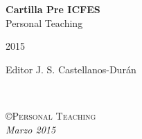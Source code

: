 \documentclass[12pt,fleqn]{book} %
\begin{document}

\newcommand{\institutionauthor}{Personal Teaching}
\begingroup
\thispagestyle{empty}
\centering
\vspace*{5.8cm}
\par\normalfont\fontsize{35}{35}\sffamily\selectfont
\textbf{Cartilla Pre ICFES}\\
\vspace*{0.5cm}
{\Huge Personal Teaching}\par %
{\Huge 2015}\par %
\vspace*{1.cm}
{\LARGE Editor J. S. Castellanos-Durán}\par
\endgroup


\newpage
~\vfill
\thispagestyle{empty}


\noindent \textsc{\copyright Personal Teaching}\\

\noindent \textit{Marzo 2015} %




%








\end{document}
